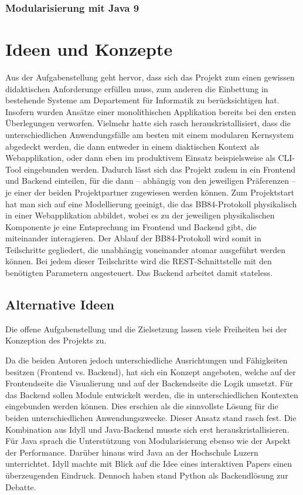 \documentclass[a4paper,10.2pt,pdftex]{scrartcl}%
\begin{document}
\subsubsection{Modularisierung mit Java 9} 


\section{Ideen und Konzepte}
Aus der Aufgabenstellung geht hervor, dass sich das Projekt zum einen gewissen didaktischen Anforderunge erfüllen muss, zum anderen die Einbettung in bestehende Systeme am Departement für Informatik zu berücksichtigen hat. Insofern wurden Ansätze einer monolithischen Applikation bereits bei den ersten Überlegungen verworfen. Vielmehr hatte sich rasch herauskristallisiert, dass die unterschiedlichen Anwendungsfälle am besten mit einem modularen Kernsystem abgedeckt werden, die dann entweder in einem diaktischen Kontext als Webapplikation, oder dann eben im produktivem Einsatz beispielsweise als CLI-Tool eingebunden werden. Dadurch lässt sich das Projekt zudem in ein Frontend und Backend einteilen, für die dann -- abhängig von den jeweiligen Präferenzen --  je einer der beiden Projektpartner zugewiesen werden können. Zum Projektstart hat man sich auf eine Modellierung geeinigt, die das BB84-Protokoll physikalisch in einer Webapplikation abbildet, wobei es zu der jeweiligen physikalischen Komponente je eine Entsprechung im Frontend und Backend gibt, die miteinander interagieren. Der Ablauf der BB84-Protokoll wird somit in Teilschritte gegliedert, die unabhängig voneinander atomar ausgeführt werden können. Bei jedem dieser Teilschritte wird die REST-Schnittstelle mit den benötigten Parametern angesteuert. Das Backend arbeitet damit stateless. 

\subsection{Alternative Ideen}
Die offene Aufgabenstellung und die Zielsetzung lassen viele Freiheiten bei der Konzeption des Projekts zu.

Da die beiden Autoren jedoch unterschiedliche Ausrichtungen und Fähigkeiten besitzen (Frontend vs. Backend), hat sich ein Konzept angeboten, welche auf der Frontendseite die Visualierung und auf der Backendseite die Logik umsetzt. Für das Backend sollen Module entwickelt werden, die in unterschiedlichen Kontexten eingebunden werden können. Dies erschien als die sinnvollste Lösung für die beiden unterschiedlichen Anwendungszwecke.  Dieser Ansatz stand rasch fest. Die Kombination aus Idyll und Java-Backend musste sich erst herauskristallisieren. Für Java sprach die Unterstützung von Modularisierung ebenso wie der Aspekt der Performance. Darüber hinaus wird Java an der Hochschule Luzern unterrichtet. Idyll machte mit Blick auf die Idee eines interaktiven Papers einen überzeugenden Eindruck. Dennoch haben stand Python als Backendlösung zur Debatte. 
\end{document}
